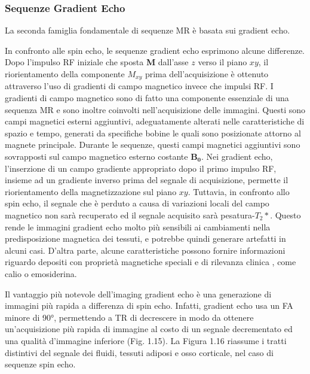 \documentclass[leqno,10pt,twocolumn,a4paper]{article}
\begin{document}
	\subsubsection{Sequenze Gradient Echo}
	La seconda famiglia fondamentale di sequenze MR è basata sui gradient echo. \par In confronto alle spin echo, le sequenze gradient echo esprimono alcune differenze. Dopo l'impulso RF iniziale che sposta
	\textbf{M} dall'asse $z$ verso il piano $xy$, il riorientamento della componente $M_{xy}$ prima dell'acquisizione è ottenuto attraverso l'uso di gradienti di campo magnetico invece che impulsi RF. I 
	gradienti di campo magnetico sono di fatto una componente essenziale di una sequenza MR e sono inoltre coinvolti nell'acquisizione delle immagini. Questi sono campi magnetici esterni aggiuntivi,
	adeguatamente alterati nelle caratteristiche di spazio e tempo, generati da specifiche bobine le quali sono posizionate attorno al magnete principale. Durante le sequenze, questi campi magnetici
	aggiuntivi sono sovrapposti sul campo magnetico esterno costante $\boldsymbol{B_0}$. Nei gradient echo, l'inserzione di un campo gradiente appropriato dopo il primo impulso RF, insieme ad un 
	gradiente inverso prima del segnale di acquisizione, permette il riorientamento della magnetizzazione sul piano $xy$. Tuttavia, in confronto allo spin echo, il segnale che è perduto a causa di variazioni locali
	del campo magnetico non sarà recuperato ed il segnale acquisito sarà pesatura-$T_2*$. Questo rende le immagini gradient echo molto più sensibili ai cambiamenti nella predisposizione magnetica dei tessuti,
	e potrebbe quindi generare artefatti in alcuni casi. D'altra parte, alcune caratteristiche possono fornire informazioni riguardo depositi con proprietà magnetiche speciali e di rilevanza clinica , come calio o 
	emosiderina. \par Il vantaggio più notevole dell'imaging gradient echo è una generazione di immagini più rapida a differenza di spin echo. Infatti, gradient echo usa un FA minore di 90°, permettendo a
	TR di decrescere in modo da ottenere un'acquisizione più rapida di immagine al costo di un segnale decrementato ed una qualità d'immagine inferiore (Fig. 1.15). La Figura 1.16 riassume i tratti distintivi del
	segnale dei fluidi, tessuti adiposi e osso corticale, nel caso di sequenze spin echo.
\end{document}
